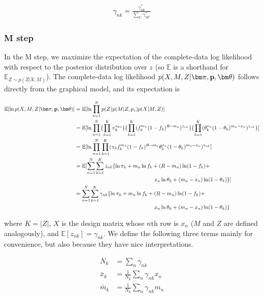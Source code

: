 \documentclass[a4paper]{article}
\newcommand{\vp}{{\bf p}}
\newcommand{\vpi}{{\bm \pi}}
\newcommand{\vtheta}{{\bm \theta}}
\newcommand{\E}{\mathbb{E}}
\begin{document}
\begin{align}
\gamma_{nk} = \frac{\gamma^*_{nk}}{\sum_{k'} \gamma^*_{nk'}}
\end{align}

\subsubsection{M step}
In the M step, we maximize the expectation of the complete-data log likelihood with respect to the posterior distribution over $z$ (so $\E$ is a shorthand for $\E_{Z \sim p(Z|X,M)}$). The complete-data log likelihood $p(X, M, Z | \vpi, \vp, \vtheta)$ follows directly from the graphical model, and its expectation is

\begin{align}
\E [ \ln p(X, M , Z | \vpi, \vp, \vtheta) ] &= \E [ \ln \prod_{n = 1}^{N}  p(Z) p(M | Z, p_{z} ) p(X | M, Z ) ] \nonumber \\
							&= \E [ \ln \prod_{n = 1}^{N} \{ \prod_{k = 1}^{K} \pi_k^{z_{kn}} \} \{ \prod_{k = 1}^{K} ( f_k^{m_n} (1-f_k)^{R - m_n} ) ^{z_{nk}} \} \{ \prod_{k = 1}^{K} ( \theta_k^{x_n} (1 - \theta_k)^{m_n - x_n} )^{z_{nk}} \} ] \notag \\
							&= \E [ \ln \prod_{n = 1}^{N} \prod_{k = 1}^{K} ( \pi_k  f_{k}^{m_n} (1-f_k)^{R - m_n} \theta_k^{x_n} (1 - \theta_k)^{m_n - x_n} )^{z_{nk}} ]  \nonumber \\
							&= \E [ \sum_{n = 1}^{N} \sum_{k = 1}^{K} z_{nk} \{ \ln \pi_k  + m_n \ln f_k + (R - m_n) \ln (1-f_k) + \notag \\
							&\phantom{---------------} x_n \ln \theta_k + (m_n - x_n) \ln (1 - \theta_k) \} ]  \nonumber \\
							&= \sum_{n = 1}^{N} \sum_{k = 1}^{K} \gamma_{nk} \{ \ln \pi_k  + m_n \ln f_k + (R - m_n) \ln (1-f_k) + \notag \\
						    &\phantom{---------------} x_n \ln \theta_k + (m_n - x_n) \ln (1 - \theta_k) \label{eq:expjointLL} \}
\end{align} 

where $K = |Z|$, $X$ is the design matrix whose $n$th row is $x_n$ ($M$ and $Z$ are defined analogously), and $\E [ z_{nk} ] = \gamma_{nk}$. We define the following three terms mainly for convenience, but also because they have nice interpretations.

\begin{align}
N_k      &= \sum_n \gamma_{nk} \label{eq:nk} \\
\bar{x}_k  &= \frac{1}{N_k} \sum_n \gamma_{nk} x_n \label{eq:xbar} \\
\bar{m}_k &= \frac{1}{N_k} \sum_n \gamma_{nk} m_n \label{eq:mbar}
\end{align}
\end{document}
